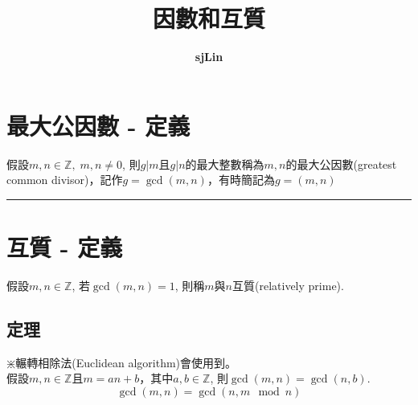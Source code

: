 \documentclass{article}
\title{因數和互質}
\author{\textbf{sjLin}}
\begin{document}
{\selectfont
\begin{CJK*}{UTF8}{bkai}
\maketitle
\noindent

\section*{最大公因數 - 定義}
假設$m,n\in\mathbb{Z},\; m,n\neq 0$,
則$g|m$且$g|n$的最大整數稱為$m,n$的最大公因數(greatest common divisor)，記作$g=\gcd(m,n)$，有時簡記為$g=(m,n)$\\	
\rule{\textwidth}{0.5pt}
\section*{互質 - 定義}
假設$m,n\in \mathbb{Z}$, 若$\gcd(m,n)=1$,
則稱$m$與$n$互質(relatively prime).
\vspace{0.5cm}
\subsection*{定理}
$\divideontimes$輾轉相除法(Euclidean algorithm)會使用到。\\
假設$m,n\in \mathbb{Z}$且$m=an+b$，其中$a,b\in \mathbb{Z}$, 則$\gcd(m,n)=\gcd(n,b)$.
\[
	\gcd(m,n)
	=
	\gcd(n,m \mod n )
\]





\end{CJK*}
}
\end{document}
